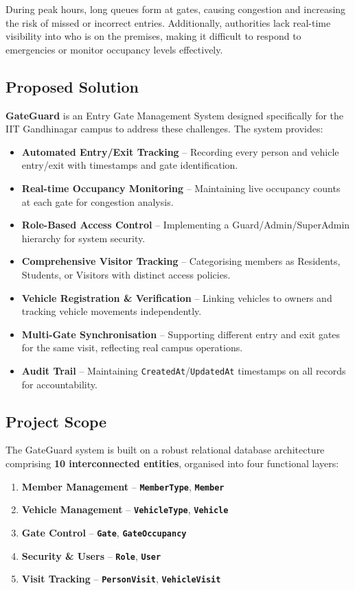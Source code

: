 \documentclass[a4paper, 12pt]{article}
\newcommand{\entityname}[1]{\texttt{\textbf{#1}}}
\begin{document}
During peak hours, long queues form at gates, causing congestion and increasing the risk of missed or incorrect entries. Additionally, authorities lack real-time visibility into who is on the premises, making it difficult to respond to emergencies or monitor occupancy levels effectively.

\subsection{Proposed Solution}

\textbf{GateGuard} is an Entry Gate Management System designed specifically for the IIT Gandhinagar campus to address these challenges. The system provides:

\begin{itemize}[leftmargin=*, nosep]
    \item \textbf{Automated Entry/Exit Tracking} -- Recording every person and vehicle entry/exit with timestamps and gate identification.
    \item \textbf{Real-time Occupancy Monitoring} -- Maintaining live occupancy counts at each gate for congestion analysis.
    \item \textbf{Role-Based Access Control} -- Implementing a Guard/Admin/SuperAdmin hierarchy for system security.
    \item \textbf{Comprehensive Visitor Tracking} -- Categorising members as Residents, Students, or Visitors with distinct access policies.
    \item \textbf{Vehicle Registration \& Verification} -- Linking vehicles to owners and tracking vehicle movements independently.
    \item \textbf{Multi-Gate Synchronisation} -- Supporting different entry and exit gates for the same visit, reflecting real campus operations.
    \item \textbf{Audit Trail} -- Maintaining \texttt{CreatedAt}/\texttt{UpdatedAt} timestamps on all records for accountability.
\end{itemize}

\subsection{Project Scope}

The GateGuard system is built on a robust relational database architecture comprising \textbf{10 interconnected entities}, organised into four functional layers:

\begin{enumerate}[leftmargin=*, nosep]
    \item \textbf{Member Management} -- \entityname{MemberType}, \entityname{Member}
    \item \textbf{Vehicle Management} -- \entityname{VehicleType}, \entityname{Vehicle}
    \item \textbf{Gate Control} -- \entityname{Gate}, \entityname{GateOccupancy}
    \item \textbf{Security \& Users} -- \entityname{Role}, \entityname{User}
    \item \textbf{Visit Tracking} -- \entityname{PersonVisit}, \entityname{VehicleVisit}
\end{enumerate}
\end{document}
